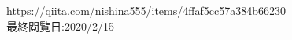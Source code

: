 \begin{thebibliography}{99}
 \url{https://qiita.com/nishina555/items/4ffaf5cc57a384b66230} \\ 最終閲覧日:2020/2/15

\end{thebibliography}


